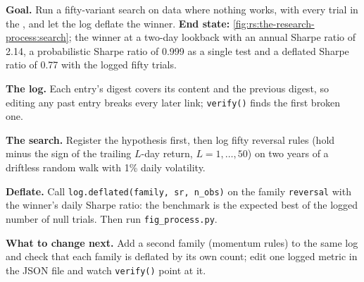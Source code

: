 \begin{tutorial}
\textbf{Goal.} Run a fifty-variant search on data where nothing works, with every trial in the , and let the log
deflate the winner. \textbf{End state:} \cref{fig:rs:the-research-process:search}; the winner at a two-day lookback with an annual
Sharpe ratio of 2.14, a probabilistic Sharpe ratio of 0.999 as a single test and a deflated Sharpe ratio of 0.77 with the
logged fifty trials.
\begin{tutsteps}
\item \textbf{The log.} Each entry's digest covers its content and the previous digest, so editing any past entry breaks
every later link; \texttt{verify()} finds the first broken one.
\label{lst:rs:the-research-process:chain}
\item \textbf{The search.} Register the hypothesis first, then log fifty reversal rules (hold minus the sign of the
trailing $L$-day return, $L = 1, \dots, 50$) on two years of a driftless random walk with 1\% daily volatility.
\label{lst:rs:the-research-process:search}
\item \textbf{Deflate.} Call \texttt{log.deflated(family, sr, n\_obs)} on the family \texttt{reversal} with the winner's daily Sharpe ratio: the benchmark is
the expected best of the logged number of null trials. Then run \texttt{fig\_process.py}.
\end{tutsteps}
\textbf{What to change next.} Add a second family (momentum rules) to the same log and check that each family is deflated by
its own count; edit one logged metric in the JSON file and watch \texttt{verify()} point at it.
\end{tutorial}

